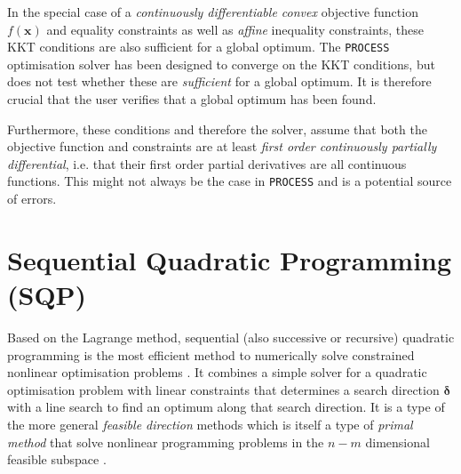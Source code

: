 \documentclass[11pt,a4paper]{report}
\newcommand{\process}{\mbox{\texttt{PROCESS}}}
\renewcommand{\vec}[1]{\boldsymbol{#1}}
\begin{document}
In the special case of a {\it continuously differentiable convex} objective
function $f(\vec{x})$ and equality constraints as well as {\it affine}
inequality constraints, these KKT conditions are also sufficient for a global
optimum. The \process\/ optimisation solver has been designed to converge on
the KKT conditions, but does not test whether these are {\it sufficient} for a
global optimum. It is therefore crucial that the user verifies that a global
optimum has been found.

Furthermore, these conditions and therefore the solver, assume that both the
objective function and constraints are at least {\it first order continuously
  partially differential}, i.e. that their first order partial derivatives are
all continuous functions. This might not always be the case in \process\/ and
is a potential source of errors.

\section{Sequential Quadratic Programming (SQP)}
\label{sec:SQP}
Based on the Lagrange method, sequential (also successive or recursive)
quadratic programming is the most efficient method to numerically solve
constrained nonlinear optimisation problems \cite{Schittkowski1980}. It
combines a simple solver for a quadratic optimisation problem with linear
constraints that determines a search direction $\vec{\delta}$ with a line
search to find an optimum along that search direction. It is a type of the
more general {\it feasible direction} methods which is itself a type of {\it
  primal method} that solve nonlinear programming problems in the $n-m$
dimensional feasible subspace \cite{Luenberger2008}.

\end{document}
